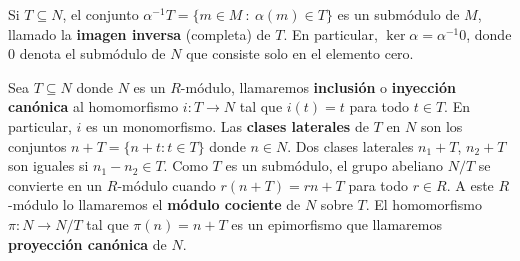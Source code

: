Si $T \subseteq N$, el conjunto
$\alpha^{-1}T = \{ m \in M \ : \ \alpha(m) \in T \}$ es un submódulo de $M$, llamado
la \textbf{imagen inversa} (completa) de $T$. En particular,
$\ker \alpha = \alpha^{-1}0$, donde $0$ denota el submódulo de $N$ que consiste solo
en el elemento cero.

Sea $T \subseteq N$ donde $N$ es un $R$-módulo, llamaremos \textbf{inclusión} o \textbf{inyección
	canónica} al homomorfismo $i: T \rightarrow N$ tal que $i(t) = t$ para todo
$t \in T$. En particular, $i$ es un monomorfismo. Las \textbf{clases laterales}
de $T$ en $N$ son los conjuntos $n + T = \{n + t : t \in T\}$ donde $n \in N$. Dos
clases laterales $n_{1}+ T$, $n_{2}+ T$ son iguales si $n_{1}- n_{2}\in T$. Como
$T$ es un submódulo, el grupo abeliano $N/T$ se convierte en un $R$-módulo
cuando $r(n+T) = rn + T$ para todo $r \in R$. A este $R$-módulo lo llamaremos el
\textbf{módulo cociente} de $N$ sobre $T$. El homomorfismo $\pi: N \rightarrow N/
T$ tal que $\pi(n) = n + T$ es un epimorfismo que llamaremos \textbf{proyección
	canónica} de $N$.

